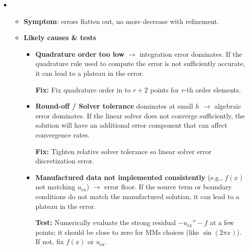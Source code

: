 \begin{itemize}
    \item {}
    \begin{itemize}
        \item[\textcolor{Green3}{\faIcon{bug}}] \textbf{Symptom}: errors flatten out, no more decrease with refinement.
        \item[\textcolor{Green3}{\faIcon{check}}] \textbf{Likely causes \& tests}
        \begin{itemize}
            \item \textbf{Quadrature order too low} $\to$ integration error dominates. If the quadrature rule used to compute the error is not sufficiently accurate, it can lead to a plateau in the error.
            
            \textcolor{Green3}{ \textbf{Fix:}} Fix quadrature order in  to $r+2$ points for $r$-th order elements.


            \item \textbf{Round-off / Solver tolerance} dominates at small $h$ $\to$ algebraic error dominates. If the linear solver does not converge sufficiently, the solution will have an additional error component that can affect convergence rates.

            \textcolor{Green3}{ \textbf{Fix:}} Tighten relative solver tolerance so linear solver error discretization error.


            \item \textbf{Manufactured data not implemented consistently} (e.g., $f(x)$ not matching $u_{\text{ex}}$) $\to$ error floor. If the source term or boundary conditions do not match the manufactured solution, it can lead to a plateau in the error.

            \textcolor{Green3}{ \textbf{Test:}} Numerically evaluate the strong residual $-u_{\text{ex}}'' - f$ at a few points; it should be close to zero for MMs choices (like $\sin(2 \pi x)$). If not, fix $f(x)$ or $u_{\text{ex}}$.
        \end{itemize}
    \end{itemize}
\end{itemize}
